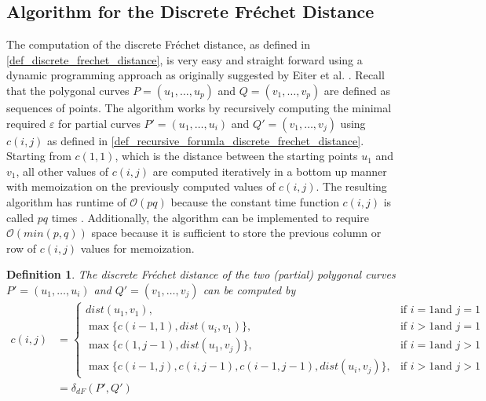\documentclass[
oneside,
fontsize=11pt
]{scrartcl}
\newtheorem{mydef}{Definition}
\begin{document}
\subsection{Algorithm for the Discrete Fréchet Distance}
\label{sec_discrete_algorithm}
The computation of the discrete Fréchet distance, as defined in \autoref{def_discrete_frechet_distance}, is very easy and straight forward 
using a dynamic programming approach as originally suggested by Eiter et al. \cite{eiter_computing_1994}.
Recall that the polygonal curves $P = (u_1, \dots, u_p)$ and $Q = (v_1, \dots, v_p)$ are defined as sequences of points.
The algorithm works by recursively computing the minimal required $\varepsilon$ for partial curves 
$P' = (u_1, \dots, u_i)$ and $Q' = (v_1, \dots, v_j)$
using $c(i,j)$ as defined in \autoref{def_recursive_forumla_discrete_frechet_distance}.
Starting from $c(1,1)$, which is the distance between the starting points $u_1$ and $v_1$,
all other values of $c(i,j)$ are computed iteratively in a bottom up manner 
with memoization on the previously computed values of $c(i,j)$.
The resulting algorithm has runtime of $\mathcal{O}(pq)$
because the constant time function $c(i,j)$ is called $pq$ times \cite{eiter_computing_1994}.
Additionally, the algorithm can be implemented to require $\mathcal{O}(min(p,q))$ space 
because it is sufficient to store the previous column or row of $c(i,j)$ values 
for memoization.

\begin{mydef}
  \label{def_recursive_forumla_discrete_frechet_distance}
  The discrete Fréchet distance of the two (partial) polygonal curves $P' = (u_1, \dots, u_i)$ and $Q' = (v_1, \dots, v_j)$
  can be computed by
  \begin{align*}
    c(i,j) &= \begin{cases}
      dist(u_1, v_1), &\text{if } i=1 \text{and } j=1 \\
      \max \{c(i-1,1), dist(u_i, v_1)\}, &\text{if } i>1 \text{and } j=1 \\
      \max \{c(1,j-1), dist(u_1, v_j)\}, &\text{if } i=1 \text{and } j>1 \\
      \max \{c(i-1,j), c(i,j-1), c(i-1,j-1), dist(u_i, v_j)\}, &\text{if } i>1 \text{and } j>1
    \end{cases} \\
    &= \delta_{dF}(P',Q')
  \end{align*}
\end{mydef}
\end{document}
